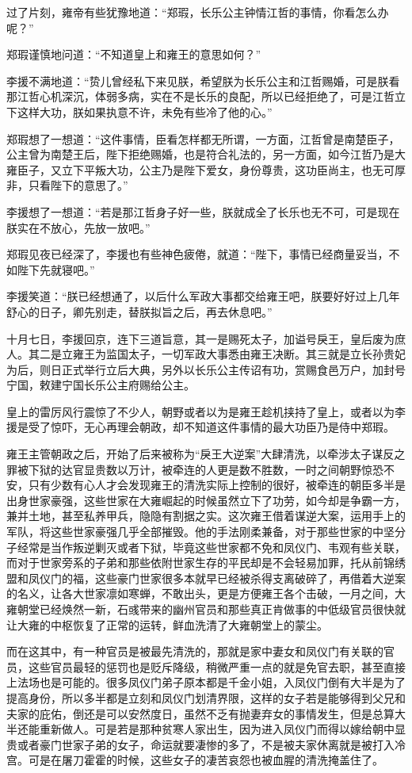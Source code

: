 过了片刻，雍帝有些犹豫地道：“郑瑕，长乐公主钟情江哲的事情，你看怎么办呢？”

郑瑕谨慎地问道：“不知道皇上和雍王的意思如何？”

李援不满地道：“贽儿曾经私下来见朕，希望朕为长乐公主和江哲赐婚，可是朕看那江哲心机深沉，体弱多病，实在不是长乐的良配，所以已经拒绝了，可是江哲立下这样大功，朕如果执意不许，未免有些冷了他的心。”

郑瑕想了一想道：“这件事情，臣看怎样都无所谓，一方面，江哲曾是南楚臣子，公主曾为南楚王后，陛下拒绝赐婚，也是符合礼法的，另一方面，如今江哲乃是大雍臣子，又立下平叛大功，公主乃是陛下爱女，身份尊贵，这功臣尚主，也无可厚非，只看陛下的意思了。”

李援想了一想道：“若是那江哲身子好一些，朕就成全了长乐也无不可，可是现在朕实在不放心，先放一放吧。”

郑瑕见夜已经深了，李援也有些神色疲倦，就道：“陛下，事情已经商量妥当，不如陛下先就寝吧。”

李援笑道：“朕已经想通了，以后什么军政大事都交给雍王吧，朕要好好过上几年舒心的日子，卿先别走，替朕拟旨之后，再去休息吧。”

十月七日，李援回京，连下三道旨意，其一是赐死太子，加谥号戾王，皇后废为庶人。其二是立雍王为监国太子，一切军政大事悉由雍王决断。其三就是立长孙贵妃为后，则日正式举行立后大典，另外以长乐公主传诏有功，赏赐食邑万户，加封号宁国，敕建宁国长乐公主府赐给公主。

皇上的雷厉风行震惊了不少人，朝野或者以为是雍王趁机挟持了皇上，或者以为李援是受了惊吓，无心再理会朝政，却不知道这件事情的最大功臣乃是侍中郑瑕。

雍王主管朝政之后，开始了后来被称为“戾王大逆案”大肆清洗，以牵涉太子谋反之罪被下狱的达官显贵数以万计，被牵连的人更是数不胜数，一时之间朝野惊恐不安，只有少数有心人才会发现雍王的清洗实际上控制的很好，被牵连的朝臣多半是出身世家豪强，这些世家在大雍崛起的时候虽然立下了功劳，如今却是争霸一方，兼并土地，甚至私养甲兵，隐隐有割据之实。这次雍王借着谋逆大案，运用手上的军队，将这些世家豪强几乎全部摧毁。他的手法刚柔兼备，对于那些世家的中坚分子经常是当作叛逆剿灭或者下狱，毕竟这些世家都不免和凤仪门、韦观有些关联，而对于世家旁系的子弟和那些依附世家生存的平民却是不会轻易加罪，托从前锦绣盟和凤仪门的福，这些豪门世家很多本就早已经被杀得支离破碎了，再借着大逆案的名义，让各大世家凛如寒蝉，不敢出头，更是方便雍王各个击破，一月之间，大雍朝堂已经焕然一新，石彧带来的幽州官员和那些真正肯做事的中低级官员很快就让大雍的中枢恢复了正常的运转，鲜血洗清了大雍朝堂上的蒙尘。

而在这其中，有一种官员是被最先清洗的，那就是家中妻女和凤仪门有关联的官员，这些官员最轻的惩罚也是贬斥降级，稍微严重一点的就是免官去职，甚至直接上法场也是可能的。很多凤仪门弟子原本都是千金小姐，入凤仪门倒有大半是为了提高身份，所以多半都是立刻和凤仪门划清界限，这样的女子若是能够得到父兄和夫家的庇佑，倒还是可以安然度日，虽然不乏有抛妻弃女的事情发生，但是总算大半还能重新做人。可是若是那种贫寒人家出生，因为进入凤仪门而得以嫁给朝中显贵或者豪门世家子弟的女子，命运就要凄惨的多了，不是被夫家休离就是被打入冷宫。可是在屠刀霍霍的时候，这些女子的凄苦哀怨也被血腥的清洗掩盖住了。

